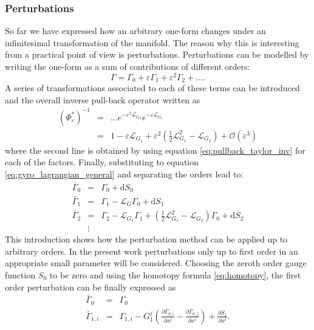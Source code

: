 \documentclass[a4paper,10pt]{article}
\begin{document}
\subsubsection{Perturbations} \label{sec:perturbations}
So far we have expressed how an arbitrary one-form changes under an infinitesimal transformation of the manifold. The reason why this is interesting from a practical point of view is perturbations. Perturbations can be modelled by writing the one-form as a sum of contributions of different orders:
\begin{equation}
\Gamma = \Gamma_0 + \varepsilon \Gamma_1 + \varepsilon^2 \Gamma_2 + \dots.
\end{equation}
A series of transformations associated to each of these terms can be introduced and the overall inverse pull-back operator written as
\begin{eqnarray*}
	(\Phi_{\varepsilon}^*)^{-1} &=& \dots e^{-\varepsilon^2 \mathcal{L}_{G_2}} e^{-\varepsilon \mathcal{L}_{G_1}} \\
	&=& 1 - \varepsilon \mathcal{L}_{G_1} + \varepsilon^2 \left( \frac{1}{2} \mathcal{L}_{G_1}^2 - \mathcal{L}_{G_2} \right) + \mathcal{O}(\varepsilon^3)
\end{eqnarray*}
where the second line is obtained by using equation \ref{eq:pullback_taylor_inv} for each of the factors. Finally, substituting to equation \ref{eq:gyro_lagrangian_general} and separating the orders lead to:
\begin{eqnarray*}
	\bar{\Gamma}_0 &=& \Gamma_0 + \mathrm{d}S_0 \\
	\bar{\Gamma}_1 &=& \Gamma_1 - \mathcal{L}_G \Gamma_0 + \mathrm{d}S_1 \\
	\bar{\Gamma}_2 &=& \Gamma_2 - \mathcal{L}_{G_1} \Gamma_1 + \left( \frac{1}{2} \mathcal{L}_{G_1}^2 - \mathcal{L}_{G_2} \right) \Gamma_0 + \mathrm{d}S_2 \\
	&\vdots&
\end{eqnarray*}
This introduction shows how the perturbation method can be applied up to arbitrary orders. In the present work perturbations only up to first order in an appropriate small parameter will be considered. Choosing the zeroth order gauge function $S_0$ to be zero and using the homotopy formula \ref{eq:homotopy}, the first order perturbation can be finally expressed as
\begin{eqnarray}
	\bar{\Gamma}_0 &=& \Gamma_0 \\
	\bar{\Gamma}_{1,i} &=& \Gamma_{1,i} - G_1^{j} \left( \frac{\partial \Gamma_{0,i}}{\partial x^{j}} - \frac{\partial \Gamma_{0,j}}{\partial x^{i}} \right) + \frac{\partial S_1}{\partial x^{i}}. 
	\label{eq:gy_final}
\end{eqnarray}
\end{document}
